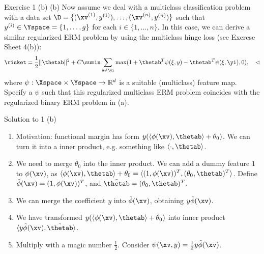 \documentclass[aspectratio=169]{beamer}
\newcommand{\thetabt}{\tilde{\thetab}}
\begin{document}
\begin{frame}{Exercise 1 (b)}
	(b) Now assume we deal with a multiclass classification problem with a data set $\D = \{(\xv^{(1)}, y^{(1)}), \ldots, (\xv^{(n)}, y^{(n)})\}$ such that $y^{(i)} \in \Yspace = \{1, \ldots, g \}$ for each $i \in \{1, \ldots, n \}$. In this case, we can derive a similar regularized ERM problem by using the multiclass hinge loss (see Exercse Sheet 4(b)):
	$$\risket = \frac{1}{2} || \thetab||^2 + C \sumin \sum_{y\neq \yi} \max (1 + \thetab^T \psi (\xi, y) - \thetab^T \psi(\xi, \yi), 0), \quad \lhd $$
	where $\psi: \Xspace \times \Yspace \to \mathbb{R}^d$ is a suitable (multiclass) feature map. Specify a $\psi$ such that this regularized multiclass ERM problem coincides with the regularized binary ERM problem in (a).
\end{frame}

\begin{frame}{Solution to 1 (b)}
	\begin{enumerate}
		\item<1-> Motivation: functional margin has form $y(\langle\phi(\xv), \thetab \rangle + \theta_0)$. We can turn it into a inner product, e.g. something like $\langle \cdot, \thetab\rangle$.
		\item<2-> We need to merge $\theta_0$ into the inner product. We can add a dummy feature $1$ to $\phi(\xv)$, as $\langle\phi(\xv), \thetab \rangle + \theta_0 = \langle(1, \phi(\xv) )^T,  (\theta_0, \thetab)^T \rangle$. Define $\tilde{\phi}(\xv) = (1, \phi(\xv))^T $, and $\tilde{\thetab} = (\theta_0, \thetab)^T$.
		\item<3-> We can merge the coefficient $y$ into $\tilde{\phi}(\xv)$, obtaining $y\tilde{\phi}(\xv)$.
		\item<4-> We have transformed $y(\langle\phi(\xv), \thetab \rangle + \theta_0)$ into inner product $\langle y \tilde{\phi}(\xv), \thetabt \rangle$.
		\item<5-> Multiply with a magic number $\frac{1}{2}$. Consider $\psi(\xv, y) = \frac{1}{2} y \tilde{\phi}(\xv)$.
	\end{enumerate}
\end{frame}
\end{document}
